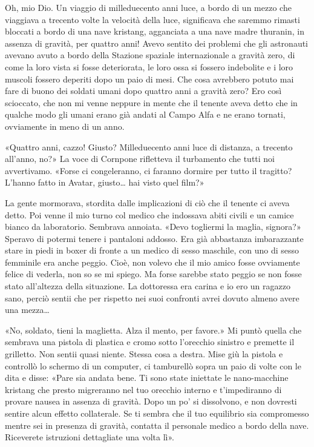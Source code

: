 Oh, mio Dio. Un viaggio di milleduecento anni luce, a bordo di un mezzo
che viaggiava a trecento volte la velocità della luce, significava che
saremmo rimasti bloccati a bordo di una nave kristang, agganciata a una
nave madre thuranin, in assenza di gravità, per quattro anni! Avevo
sentito dei problemi che gli astronauti avevano avuto a bordo della
Stazione spaziale internazionale a gravità zero, di come la loro vista
si fosse deteriorata, le loro ossa si fossero indebolite e i loro
muscoli fossero deperiti dopo un paio di mesi. Che cosa avrebbero potuto
mai fare di buono dei soldati umani dopo quattro anni a gravità zero?
Ero così scioccato, che non mi venne neppure in mente che il tenente
aveva detto che in qualche modo gli umani erano già andati al Campo Alfa
e ne erano tornati, ovviamente in meno di un anno.

«Quattro anni, cazzo! Giusto? Milleduecento anni luce di distanza, a
trecento all'anno, no?» La voce di Cornpone rifletteva il turbamento che
tutti noi avvertivamo. «Forse ci congeleranno, ci faranno dormire per
tutto il tragitto? L'hanno fatto in Avatar, giusto\ldots{} hai visto
quel film?»

La gente mormorava, stordita dalle implicazioni di ciò che il tenente ci
aveva detto. Poi venne il mio turno col medico che indossava abiti
civili e un camice bianco da laboratorio. Sembrava annoiata. «Devo
togliermi la maglia, signora?» Speravo di potermi tenere i pantaloni
addosso. Era già abbastanza imbarazzante stare in piedi in boxer di
fronte a un medico di sesso maschile, con uno di sesso femminile era
anche peggio. Cioè, non volevo che il mio amico fosse ovviamente felice
di vederla, non so se mi spiego. Ma forse sarebbe stato peggio se non
fosse stato all'altezza della situazione. La dottoressa era carina e io
ero un ragazzo sano, perciò sentii che per rispetto nei suoi confronti
avrei dovuto almeno avere una mezza\ldots{}

«No, soldato, tieni la maglietta. Alza il mento, per favore.» Mi puntò
quella che sembrava una pistola di plastica e cromo sotto l'orecchio
sinistro e premette il grilletto. Non sentii quasi niente. Stessa cosa a
destra. Mise giù la pistola e controllò lo schermo di un computer, ci
tamburellò sopra un paio di volte con le dita e disse: «Pare sia andata
bene. Ti sono state iniettate le nano-macchine kristang che presto
migreranno nel tuo orecchio interno e t'impediranno di provare nausea in
assenza di gravità. Dopo un po' si dissolvono, e non dovresti sentire
alcun effetto collaterale. Se ti sembra che il tuo equilibrio sia
compromesso mentre sei in presenza di gravità, contatta il personale
medico a bordo della nave. Riceverete istruzioni dettagliate una volta
lì».

